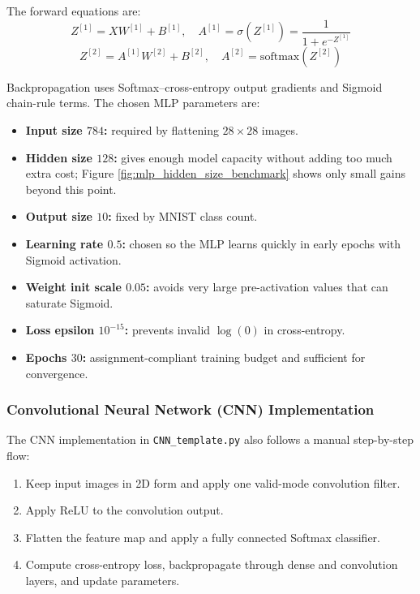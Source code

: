 The forward equations are:
\begin{equation}
Z^{[1]} = XW^{[1]} + B^{[1]}, \quad A^{[1]} = \sigma\left(Z^{[1]}\right) = \frac{1}{1 + e^{-Z^{[1]}}}
\end{equation}
\begin{equation}
Z^{[2]} = A^{[1]}W^{[2]} + B^{[2]}, \quad A^{[2]} = \mathrm{softmax}\left(Z^{[2]}\right)
\end{equation}

Backpropagation uses Softmax--cross-entropy output gradients and Sigmoid chain-rule terms. The chosen MLP parameters are:
\begin{itemize}
    \item \textbf{Input size $784$:} required by flattening $28\times 28$ images.
    \item \textbf{Hidden size $128$:} gives enough model capacity without adding too much extra cost; Figure \ref{fig:mlp_hidden_size_benchmark} shows only small gains beyond this point.
    \item \textbf{Output size $10$:} fixed by MNIST class count.
    \item \textbf{Learning rate $0.5$:} chosen so the MLP learns quickly in early epochs with Sigmoid activation.
    \item \textbf{Weight init scale $0.05$:} avoids very large pre-activation values that can saturate Sigmoid.
    \item \textbf{Loss epsilon $10^{-15}$:} prevents invalid $\log(0)$ in cross-entropy.
    \item \textbf{Epochs $30$:} assignment-compliant training budget and sufficient for convergence.
\end{itemize}

\subsubsection{Convolutional Neural Network (CNN) Implementation}
The CNN implementation in \texttt{CNN\_template.py} also follows a manual step-by-step flow:
\begin{enumerate}
    \item Keep input images in 2D form and apply one valid-mode convolution filter.
    \item Apply ReLU to the convolution output.
    \item Flatten the feature map and apply a fully connected Softmax classifier.
    \item Compute cross-entropy loss, backpropagate through dense and convolution layers, and update parameters.
\end{enumerate}

